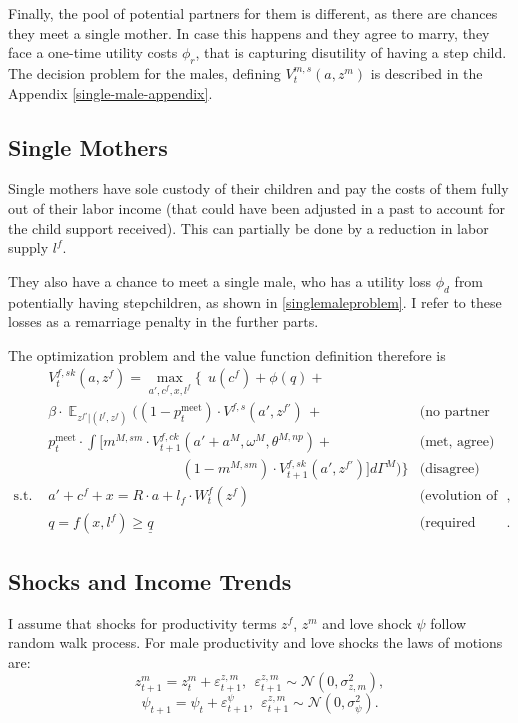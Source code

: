 \documentclass[12pt,letter]{article}
\DeclareMathOperator{\E}{\mathbb{E}}
\begin{document}
Finally, the pool of potential partners for them is different, as there are chances they meet a single mother. In case this happens and they agree to marry, they face a one-time utility costs $\phi_r$, that is capturing disutility of having a step child. The decision problem for the males, defining $V^{m,s}_t(a,z^m)$ is described in the Appendix \ref{single-male-appendix}.


\subsection{Single Mothers}

Single mothers have sole custody of their children and pay the costs of them fully out of their labor income (that could have been adjusted in a past to account for the child support received). This can partially be done by a reduction in labor supply $l^f$.

They also have a chance to meet a single male, who has a utility loss $\phi_d$ from potentially having stepchildren, as shown in \ref{singlemaleproblem}. I refer to these losses as a remarriage penalty in the further parts.

The optimization problem and the value function definition therefore is
\begin{align} & V_t^{f,sk}(a,z^f)  = \max\limits_{a',c^f,x,l^f} \Bigg\{ \ \ u(c^f) + \phi(q) + \\\nonumber &  \beta\cdot \E_{z^{f\prime}|(l^f,z^f)} \Bigg( (1-p^{\text{meet}}_t)\cdot V^{f,s}(a',z^{f\prime}) \,+ & \text{(no partner met)}\\\nonumber
 & p^{\text{meet}}_t  \cdot \int \Big[m^{M,sm}\cdot V^{f,ck}_{t+1}(a'+a^M,\omega^M,\theta^{M,np}) + & \text{(met, agree)}\\\nonumber
 &\hspace{4cm}(1-m^{M,sm})\cdot V^{f,sk}_{t+1}(a',z^{f\prime}) \Big]d\Gamma^M\Bigg) \Bigg\}  & \text{(disagree)}\\\nonumber
 \text{s.t. \ } & a' + c^f + x = R\cdot a  + l_f\cdot W^f_t(z^f) & \text{(evolution of the assets)},\\\nonumber
                    & q = f(x,l^f) \geq \underline{q} & \text{(required costs of childcare)}.
\end{align}



\subsection{Shocks and Income Trends\label{transition-laws}}
I assume that shocks for productivity terms $z^f$, $z^m$ and love shock $\psi$ follow random walk process. For male productivity and love shocks the laws of motions are:
\begin{equation}\label{z-male-eq}
z^m_{t+1} = z^m_t + \varepsilon^{z,m}_{t+1}, \ \ \varepsilon^{z,m}_{t+1}\sim \mathcal{N}(0,\sigma^2_{z,m}),
\end{equation}
\begin{equation}\label{psi-eq}
\psi_{t+1} = \psi_t + \varepsilon^{\psi}_{t+1}, \ \ \varepsilon^{z,m}_{t+1}\sim \mathcal{N}(0,\sigma^2_{\psi}).
\end{equation}
\end{document}
